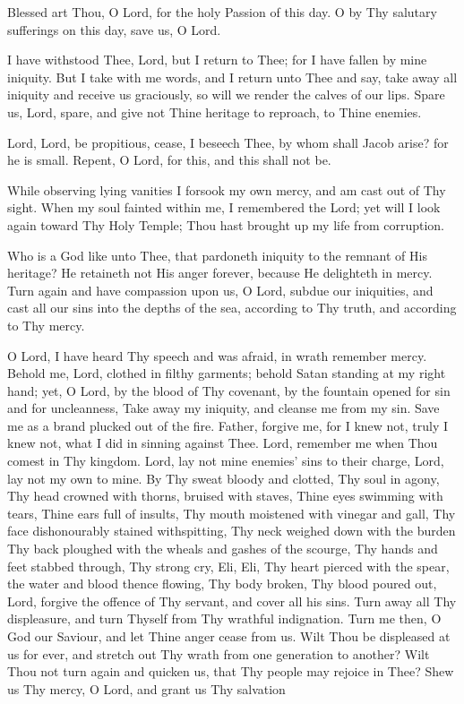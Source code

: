 Blessed art Thou, O Lord, for the holy Passion of this day. O by Thy salutary sufferings on this day, save us, O Lord.


I have withstood Thee, Lord, but I return to Thee; for I have fallen by mine iniquity. But I take with me words, and I return unto Thee and say, take away all iniquity and receive us graciously, so will we render the calves of our lips. Spare us, Lord, spare, and give not Thine heritage to reproach, to Thine enemies.

Lord, Lord, be propitious, cease, I beseech Thee, by whom shall Jacob arise? for he is small. Repent, O Lord, for this, and this shall not be.

While observing lying vanities I forsook my own mercy, and am cast out of Thy sight. When my soul fainted within me, I remembered the Lord; yet will I look again toward Thy Holy Temple; Thou hast brought up my life from corruption.

Who is a God like unto Thee, that pardoneth iniquity to the remnant of His heritage? He retaineth not His anger forever, because He delighteth in mercy. Turn again and have compassion upon us, O Lord, subdue our iniquities, and cast all our sins into the depths of the sea, according to Thy truth, and according to Thy mercy.

O Lord, I have heard Thy speech and was afraid, in wrath remember mercy. Behold me, Lord, clothed in filthy garments; behold Satan standing at my right hand; yet, O Lord, by the blood of Thy covenant, by the fountain opened for sin and for uncleanness, Take away my iniquity, and cleanse me from my sin. Save me as a brand plucked out of the fire.  Father, forgive me, for I knew not, truly I knew not, what I did in sinning against Thee. Lord, remember me  when Thou comest in Thy kingdom. Lord, lay not mine enemies’ sins to their charge, Lord, lay not my own to mine. By Thy sweat bloody and clotted, Thy soul in agony, Thy head crowned with thorns, bruised with staves, Thine eyes swimming with tears, Thine ears full of insults, Thy mouth moistened with vinegar and gall, Thy face dishonourably stained withspitting, Thy neck weighed down with the burden Thy back ploughed with the wheals and gashes of the scourge, Thy hands and feet stabbed through,  Thy strong cry, Eli, Eli, Thy heart pierced with the spear, the water and blood thence flowing, Thy body broken, Thy blood poured out, Lord, forgive the offence of Thy servant, and cover all his sins. Turn away all Thy displeasure, and turn Thyself from Thy wrathful indignation. Turn me then, O God our Saviour, and let Thine anger cease from us. Wilt Thou be displeased at us for ever, and stretch out Thy wrath from one generation to another? Wilt Thou not turn again and quicken us, that Thy people may rejoice in Thee? Shew us Thy mercy, O Lord, and grant us Thy salvation

